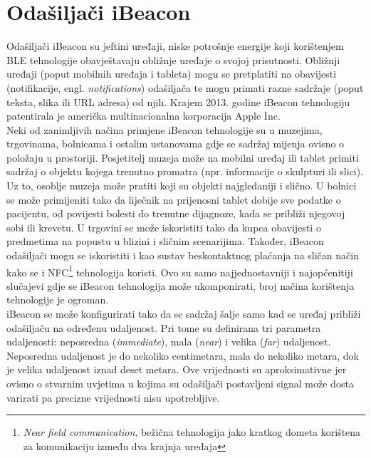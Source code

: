 \chapter{Odašiljači iBeacon}
\label{chap:ibeacon}

Odašiljači iBeacon su jeftini uređaji, niske potrošnje energije koji korištenjem BLE tehnologije obavještavaju obližnje uređaje o svojoj prisutnosti. 
Obližnji uređaji (poput mobilnih uređaja i tableta) mogu se pretplatiti na obavijesti (notifikacije, engl. \textit{notifications}) odašiljača te mogu primati razne sadržaje (poput teksta, slika ili URL adresa) od njih. 
Krajem 2013. godine iBeacon tehnologiju patentirala je američka multinacionalna korporacija Apple Inc.
\\

Neki od zanimljivih načina primjene iBeacon tehnologije su u muzejima, trgovinama, bolnicama i ostalim ustanovama gdje se sadržaj mijenja ovisno o položaju u prostoriji. 
Posjetitelj muzeja može na mobilni uređaj ili tablet primiti sadržaj o objektu kojega trenutno promatra (npr. informacije o skulpturi ili slici). Uz to, osoblje muzeja može pratiti koji su objekti najgledaniji i slično. 
U bolnici se može primijeniti tako da liječnik na prijenosni tablet dobije sve podatke o pacijentu, od povijesti bolesti do trenutne dijagnoze, kada se približi njegovoj sobi ili krevetu. 
U trgovini se može iskoristiti tako da kupca obavijesti o predmetima na popustu u blizini i sličnim scenarijima. 
Također, iBeacon odašiljači mogu se iskoristiti i kao sustav beskontaktnog plaćanja na sličan način kako se i NFC\footnote{\textit{Near field communication}, bežična tehnologija jako kratkog dometa korištena za komunikaciju između dva krajnja uređaja} tehnologija koristi.
Ovo su samo najjednostavniji i najopćenitiji slučajevi gdje se iBeacon tehnologija može ukomponirati, broj načina korištenja tehnologije je ogroman.
\\

iBeacon se može konfigurirati tako da se sadržaj šalje samo kad se uređaj približi odašiljaču na određenu udaljenost. 
Pri tome su definirana tri parametra udaljenosti: neposredna (\textit{immediate}), mala (\textit{near}) i velika (\textit{far}) udaljenost. 
Neposredna udaljenost je do nekoliko centimetara, mala do nekoliko metara, dok je velika udaljenost iznad deset metara. 
Ove vrijednosti su aproksimativne jer ovisno o stvarnim uvjetima u kojima su odašiljači postavljeni signal može dosta varirati pa precizne vrijednosti nisu upotrebljive.
\\


